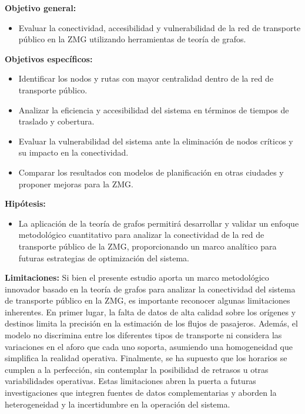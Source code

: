 \documentclass[openany]{book}
\begin{document}
	\textbf{Objetivo general:}
	\begin{itemize}
		\item Evaluar la conectividad, accesibilidad y vulnerabilidad de la red de transporte público en la ZMG utilizando herramientas de teoría de grafos.
	\end{itemize}

	\textbf{Objetivos específicos:}
	\begin{itemize}
		\item Identificar los nodos y rutas con mayor centralidad dentro de la red de transporte público.
		\item Analizar la eficiencia y accesibilidad del sistema en términos de tiempos de traslado y cobertura.
		\item Evaluar la vulnerabilidad del sistema ante la eliminación de nodos críticos y su impacto en la conectividad.
		\item Comparar los resultados con modelos de planificación en otras ciudades y proponer mejoras para la ZMG.
	\end{itemize}

	\textbf{Hipótesis:}
	\begin{itemize}
		\item La aplicación de la teoría de grafos permitirá desarrollar y validar un enfoque metodológico cuantitativo para analizar la conectividad de la red de transporte público de la ZMG, proporcionando un marco analítico para futuras estrategias de optimización del sistema.
	\end{itemize}

	\textbf{Limitaciones:} Si bien el presente estudio aporta un marco metodológico innovador basado en la teoría de grafos para analizar la conectividad del sistema de transporte público en la ZMG, es importante reconocer algunas limitaciones inherentes. En primer lugar, la falta de datos de alta calidad sobre los orígenes y destinos limita la precisión en la estimación de los flujos de pasajeros. Además, el modelo no discrimina entre los diferentes tipos de transporte ni considera las variaciones en el aforo que cada uno soporta, asumiendo una homogeneidad que simplifica la realidad operativa. Finalmente, se ha supuesto que los horarios se cumplen a la perfección, sin contemplar la posibilidad de retrasos u otras variabilidades operativas. Estas limitaciones abren la puerta a futuras investigaciones que integren fuentes de datos complementarias y aborden la heterogeneidad y la incertidumbre en la operación del sistema.
\end{document}
